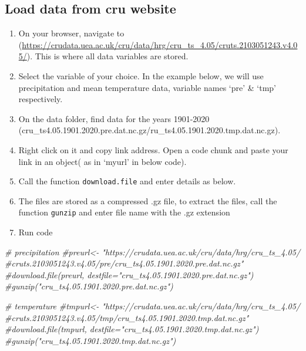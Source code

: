 \documentclass[
]{book}
\newenvironment{Shaded}{\begin{snugshade}}{\end{snugshade}}
\newcommand{\CommentTok}[1]{\textcolor[rgb]{0.56,0.35,0.01}{\textit{#1}}}
\providecommand{\tightlist}{%
  \setlength{\itemsep}{0pt}\setlength{\parskip}{0pt}}
\begin{document}
\hypertarget{load-data-from-cru-website}{%
\subsection{Load data from cru website}\label{load-data-from-cru-website}}

\begin{enumerate}
\def\labelenumi{\arabic{enumi}.}
\tightlist
\item
  On your browser, navigate to (\url{https://crudata.uea.ac.uk/cru/data/hrg/cru_ts_4.05/cruts.2103051243.v4.05/}). This is where all data variables are stored.
\item
  Select the variable of your choice. In the example below, we will use precipitation and mean temperature data, variable names `pre' \& `tmp' respectively.
\item
  On the data folder, find data for the years 1901-2020
  (cru\_ts4.05.1901.2020.pre.dat.nc.gz/ru\_ts4.05.1901.2020.tmp.dat.nc.gz).
\item
  Right click on it and copy link address. Open a code chunk and paste your link in an object( as in `myurl' in below code).
\item
  Call the function \texttt{download.file} and enter details as below.
\item
  The files are stored as a compressed .gz file, to extract the files, call the function \texttt{gunzip} and enter file name with the .gz extension
\item
  Run code
\end{enumerate}

\begin{Shaded}
\begin{Highlighting}[]
\CommentTok{\# precipitation}
\CommentTok{\#preurl\textless{}{-} "https://crudata.uea.ac.uk/cru/data/hrg/cru\_ts\_4.05/}
\CommentTok{\#cruts.2103051243.v4.05/pre/cru\_ts4.05.1901.2020.pre.dat.nc.gz"}
\CommentTok{\#download.file(preurl, destfile="cru\_ts4.05.1901.2020.pre.dat.nc.gz")}
\CommentTok{\#gunzip("cru\_ts4.05.1901.2020.pre.dat.nc.gz")}

\CommentTok{\# temperature}
\CommentTok{\#tmpurl\textless{}{-} "https://crudata.uea.ac.uk/cru/data/hrg/cru\_ts\_4.05/}
\CommentTok{\#cruts.2103051243.v4.05/tmp/cru\_ts4.05.1901.2020.tmp.dat.nc.gz"}
\CommentTok{\#download.file(tmpurl, destfile="cru\_ts4.05.1901.2020.tmp.dat.nc.gz")}
\CommentTok{\#gunzip("cru\_ts4.05.1901.2020.tmp.dat.nc.gz")}
\end{Highlighting}
\end{Shaded}
\end{document}

